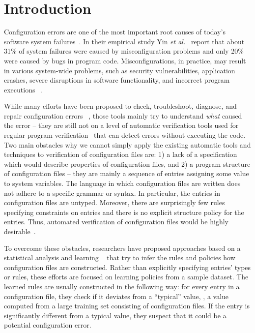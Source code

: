 \section{Introduction}
\label{sec-intro}

Configuration errors are one of the most important root causes of
today's software system failures~\cite{xu15systems, yin11anempirical}.
In their empirical study Yin {\em et al.}~\cite{yin11anempirical} report
that about 31\% of system failures were caused by misconfiguration problems and only 20\% were caused by bugs in program code. 
Misconfigurations, in practice, may result in various
system-wide problems, such as security vulnerabilities, 
application crashes, severe disruptions in software
functionality, and incorrect program executions%
~\cite{zhang14encore, yuan11context, xu13do, xu15hey}.  

While many efforts have been proposed 
to check, troubleshoot, diagnose, and repair configuration errors%
~\cite{attariyan10automating,
su07autobash, whitaker04configuration},
those tools mainly try to understand {\emph{what}} caused the 
error -- they are still not on a level of
automatic verification tools used for regular program 
verification~\cite{Leino10Dafny, PiskacWZ14, BobotFMP15} that can
detect errors without executing the code.
Two main obstacles why we cannot simply apply the existing automatic 
tools and techniques to verification of configuration files are: 1) a lack
of a specification which would describe properties of configuration files, and 2) a program structure of configuration files -- they
are mainly a sequence of entries assigning some value to system variables. The language in which configuration files are written does 
not adhere to a specific grammar or syntax. In particular, the
entries in configuration files are untyped. Moreover, there are surprisingly few rules specifying constraints on entries and there
is no explicit structure policy for the entries.
Thus, automated verification of configuration 
files would be highly
desirable~\cite{wang04automatic, zhang14encore, xu15systems}.

To overcome these obstacles, researchers have proposed approaches based on
a statistical analysis and learning%
~\cite{wang04automatic, zhang14encore, yuan11context}
that try to infer the rules and policies 
how configuration files are constructed.
Rather than explicitly specifying entries' types or rules, 
these efforts are focused on learning policies from a sample dataset.
The learned rules are usually constructed in the following way: 
for every entry in a configuration file, 
they check if it deviates from a ``typical'' value, \ie, 
a value computed from a large training set 
consisting of configuration files.
If the entry is significantly different from a typical value, 
they suspect that it could be a potential configuration error.

